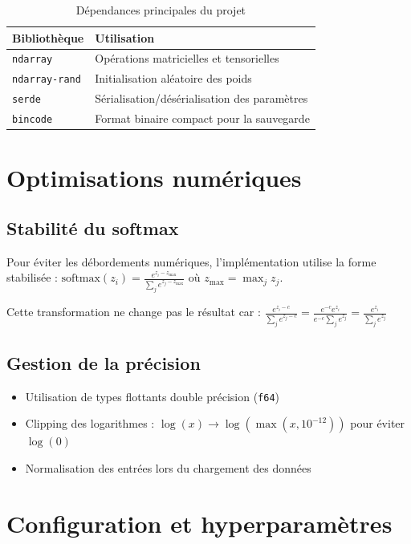\documentclass[12pt,a4paper]{report}
\numberwithin{equation}{section}
\begin{document}
\begin{table}[h]
\centering
\begin{tabular}{ll}
\toprule
\textbf{Bibliothèque} & \textbf{Utilisation} \\
\midrule
\texttt{ndarray} & Opérations matricielles et tensorielles \\
\texttt{ndarray-rand} & Initialisation aléatoire des poids \\
\texttt{serde} & Sérialisation/désérialisation des paramètres \\
\texttt{bincode} & Format binaire compact pour la sauvegarde \\
\bottomrule
\end{tabular}
\caption{Dépendances principales du projet}
\end{table}

\section{Optimisations numériques}

\subsection{Stabilité du softmax}
Pour éviter les débordements numériques, l'implémentation utilise la forme stabilisée :
$\text{softmax}(z_i) = \frac{e^{z_i - z_{\max}}}{\sum_j e^{z_j - z_{\max}}}$
où $z_{\max} = \max_j z_j$.

Cette transformation ne change pas le résultat car :
$\frac{e^{z_i - c}}{\sum_j e^{z_j - c}} = \frac{e^{-c} e^{z_i}}{e^{-c} \sum_j e^{z_j}} = \frac{e^{z_i}}{\sum_j e^{z_j}}$

\subsection{Gestion de la précision}
\begin{itemize}
  \item Utilisation de types flottants double précision (\texttt{f64})
  \item Clipping des logarithmes : $\log(x) \to \log(\max(x, 10^{-12}))$ pour éviter $\log(0)$
  \item Normalisation des entrées lors du chargement des données
\end{itemize}

\section{Configuration et hyperparamètres}
\end{document}
